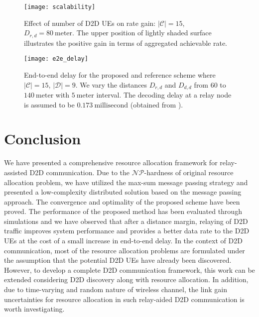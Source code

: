 \documentclass[twocolumn,10pt]{IEEEtran}
\begin{document}
\begin{figure}[h t b]
\centering
\texttt{[image: scalability]}
\caption{Effect of number of D2D UEs on rate gain: $|\mathcal{C}| = 15$, $D_{r,d} = 80~ \text{meter}$. The upper position of lightly shaded surface illustrates the positive gain in terms of aggregated achievable rate.}
\label{fig:scal}
\end{figure}

\begin{figure}[h t b]
\centering
\texttt{[image: e2e\_delay]}
\caption{End-to-end delay for the proposed and reference scheme where $|\mathcal{C}| = 15$,  $|\mathcal{D}| = 9$. We vary the distances $D_{r,d}$ and $D_{d,d}$ from $60$ to $140 ~\text{meter}$ with $5  ~\text{meter}$ interval. The decoding delay at a relay node is assumed to be $0.173~ \text{millisecond}$ (obtained from \cite{delay_imt}).}
\label{fig:delay}
\end{figure} 


\section{Conclusion} \label{sec:conclusion}

We have presented a comprehensive resource allocation
framework for relay-assisted D2D communication. Due to the $\mathcal{NP}$-hardness of original resource allocation problem, we have utilized the max-sum message passing strategy and presented a low-complexity distributed solution based on the message passing approach.  The convergence and optimality of the proposed scheme have been proved. The performance of the proposed method has been evaluated through simulations and we have observed that after a distance margin, relaying of D2D traffic improves system performance and provides a better data rate to the D2D UEs at the cost of a small increase in end-to-end delay.
In the context of D2D communication, most of the resource allocation problems are formulated under the assumption that the potential D2D UEs have already been discovered. However, to develop a complete D2D communication framework, this work can be extended considering D2D discovery along with resource allocation. In addition, due to time-varying and random nature of wireless channel, the link gain uncertainties for resource allocation in such relay-aided D2D communication is worth investigating.
\end{document}
